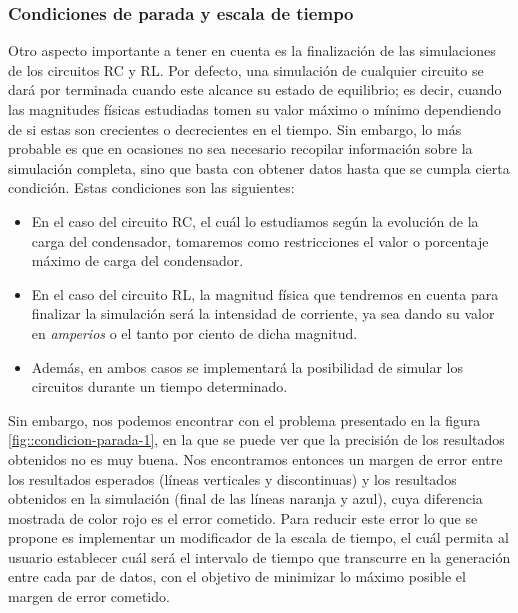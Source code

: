 \documentclass[../main.tex]{subfiles}
\begin{document}
\subsubsection{Condiciones de parada y escala de tiempo}
Otro aspecto importante a tener en cuenta es la finalización de las simulaciones de los circuitos RC y RL. Por defecto, una simulación de cualquier circuito se dará por terminada cuando este alcance su estado de equilibrio; es decir, cuando las magnitudes físicas estudiadas tomen su valor máximo o mínimo dependiendo de si estas son crecientes o decrecientes en el tiempo. Sin embargo, lo más probable es que en ocasiones no sea necesario recopilar información sobre la simulación completa, sino que basta con obtener datos hasta que se cumpla cierta condición. Estas condiciones son las siguientes:\\

\begin{itemize}
    \item En el caso del circuito RC, el cuál lo estudiamos según la evolución de la carga del condensador, tomaremos como restricciones el valor o porcentaje máximo de carga del condensador.

    \item En el caso del circuito RL, la magnitud física que tendremos en cuenta para finalizar la simulación será la intensidad de corriente, ya sea dando su valor en \textit{amperios} o el tanto por ciento de dicha magnitud.

    \item Además, en ambos casos se implementará la posibilidad de simular los circuitos durante un tiempo determinado.
    
\end{itemize}

Sin embargo, nos podemos encontrar con el problema presentado en la figura \ref{fig::condicion-parada-1}, en la que se puede ver que la precisión de los resultados obtenidos no es muy buena. Nos encontramos entonces un margen de error entre los resultados esperados (líneas verticales y discontinuas) y los resultados obtenidos en la simulación (final de las líneas naranja y azul), cuya diferencia mostrada de color rojo es el error cometido. Para reducir este error lo que se propone es implementar un modificador de la escala de tiempo, el cuál permita al usuario establecer cuál será el intervalo de tiempo que transcurre en la generación entre cada par de datos, con el objetivo de minimizar lo máximo posible el margen de error cometido.
\end{document}
